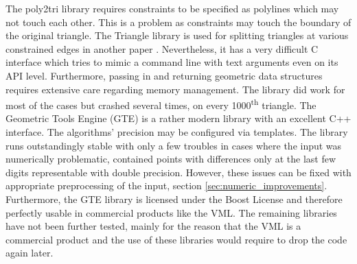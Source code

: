 The poly2tri library requires constraints to be specified as polylines which may not touch each other.
This is a problem as constraints may touch the boundary of the original triangle.
%
The Triangle library is used for splitting triangles at various constrained edges in another paper \cite{mesh_intersection}.
Nevertheless, it has a very difficult C interface which tries to mimic a command line with text arguments even on its API level.
Furthermore, passing in and returning geometric data structures requires extensive care regarding memory management.
The library did work for most of the cases but crashed several times, \eg on every 1000\textsuperscript{th} triangle.  
%
The Geometric Tools Engine (GTE) is a rather modern library with an excellent C++ interface.
The algorithms' precision may be configured via templates.
The library runs outstandingly stable with only a few troubles in cases where the input was numerically problematic, \eg contained points with differences only at the last few digits representable with double precision.
However, these issues can be fixed with appropriate preprocessing of the input, \cf section \ref{sec:numeric_improvements}.
Furthermore, the GTE library is licensed under the Boost License and therefore perfectly usable in commercial products like the VML.
%
The remaining libraries have not been further tested, mainly for the reason that the VML is a commercial product and the use of these libraries would require to drop the code again later.


